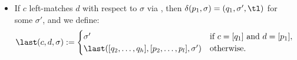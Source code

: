 \begin{defn}
\begin{itemize}
\begin{equation*}
		      \end{equation*}
		\item If $c$ left-matches $d$ with respect to $\sigma$ via , then $\delta(p_1,\sigma)=(q_1,\sigma',\tl)$ for some $\sigma'$, and we define:
		      \begin{equation*}
			      \last(c,d,\sigma):=\begin{cases}
				      \sigma'                                        & \text{if } c=[q_1] \text{ and } d=[p_1],~~ \\
				      \last([q_2,\dots,q_h],[p_2,\dots,p_l],\sigma') & \text{otherwise}.
			      \end{cases}
		      \end{equation*}
	\end{itemize}
\end{defn}


